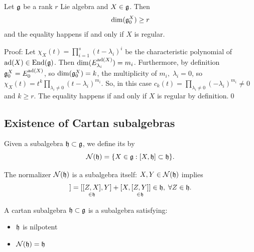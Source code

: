 \begin{dang}
    \begin{lemma}
        Let $\mathfrak{g}$ be a rank $r$ Lie algebra and $X\in\mathfrak{g}$. Then 
        \begin{equation}
            \dim(\mathfrak{g}_0^X)\geq r 
        \end{equation}
        and the equality happens if and only if $X$ is regular.
    \end{lemma}
\end{dang}
Proof: Let $\chi_X(t)=\prod_{i=1}^s(t-\lambda_i)^i$ be the characteristic polynomial of $\text{ad}(X)\in\text{End}(\mathfrak{g})$. Then 
$\dim(E_{\lambda_i}^{\text{ad}(X)})=m_i$. Furthermore, by definition $\mathfrak{g}_0^X=E_0^{\text{ad}(X)}$, so 
$\dim(\mathfrak{g}_0^X)=k$, the multiplicity of $m_i,\;\lambda_i=0$, so 
$\chi_X(t)=t^k\prod_{\lambda_i\neq0}(t-\lambda_i)^{m_i}$. 
So, in this case $c_k(t)=\prod_{\lambda_i\neq0}(-\lambda_i)^{m_i}\neq0$ and $k\geq r$. The equality happens if and only if 
$X$ is regular by definition.\qed


\subsection{Existence of Cartan subalgebras}

        \begin{dang}
            \begin{definition}
                Given a subalgebra $\mathfrak{h}\subset\mathfrak{g}$, we define its  by
                \begin{equation}
                    \mathcal{N}(\mathfrak{h})=\{X\in\mathfrak{g}:[X,\mathfrak{h}]\subset\mathfrak{h}\}.
                \end{equation}
            \end{definition}
        \end{dang}
The normalizer $\mathcal{N}(\mathfrak{h})$ is a subalgebra itself: $X,Y\in\mathcal{N}(\mathfrak{h})$ implies 
\begin{equation}
    [Z,[X,Y]]=[\underset{\in\fr{h}}{[Z,X]},Y]+[X,\underset{\in\fr{h}}{[Z,Y]}]\in\fr{h},\;\forall Z\in\fr{h}.
\end{equation}
 
\begin{dang}
    \begin{definition}
        A cartan subalgebra $\mathfrak{h}\subset\mathfrak{g}$ is a subalgebra satisfying:
        \begin{itemize}
            \item[1.] $\mathfrak{h}$ is nilpotent
            \item[2.] $\mathcal{N}(\mathfrak{h})=\mathfrak{h}$
        \end{itemize}
    \end{definition}
\end{dang}


